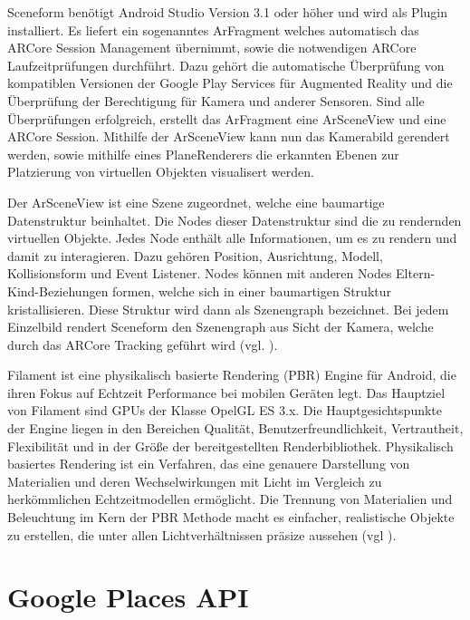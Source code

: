 Sceneform benötigt Android Studio Version 3.1 oder höher und wird als Plugin installiert. Es liefert ein sogenanntes \glqq ArFragment\grqq{} welches automatisch das ARCore Session Management übernimmt, sowie die notwendigen ARCore Laufzeitprüfungen durchführt. Dazu gehört die automatische Überprüfung von kompatiblen Versionen der Google Play Services für Augmented Reality und die Überprüfung der Berechtigung für Kamera und anderer Sensoren. Sind alle Überprüfungen erfolgreich, erstellt das ArFragment eine \glqq ArSceneView\grqq{} und eine ARCore Session. Mithilfe der ArSceneView kann nun das Kamerabild gerendert werden, sowie mithilfe eines \glqq PlaneRenderers\grqq{} die erkannten Ebenen zur Platzierung von virtuellen Objekten visualisert werden.

Der ArSceneView ist eine Szene zugeordnet, welche eine baumartige Datenstruktur beinhaltet. Die Nodes dieser Datenstruktur sind die zu rendernden virtuellen Objekte. Jedes Node enthält alle Informationen, um es zu rendern und damit zu interagieren. Dazu gehören Position, Ausrichtung, Modell, Kollisionsform und Event Listener. Nodes können mit anderen Nodes Eltern-Kind-Beziehungen formen, welche sich in einer baumartigen Struktur kristallisieren. Diese Struktur wird dann als Szenengraph bezeichnet. Bei jedem Einzelbild rendert Sceneform den Szenengraph aus Sicht der Kamera, welche durch das ARCore Tracking geführt wird (vgl. \cite{sceneform_google}). 

Filament ist eine physikalisch basierte Rendering (PBR) Engine für Android, die ihren Fokus auf Echtzeit Performance bei mobilen Geräten legt. Das Hauptziel von Filament sind GPUs der Klasse OpelGL ES 3.x. Die Hauptgesichtspunkte der Engine liegen in den Bereichen Qualität, Benutzerfreundlichkeit, Vertrautheit, Flexibilität und in der Größe der bereitgestellten Renderbibliothek. Physikalisch basiertes Rendering ist ein Verfahren, das eine genauere Darstellung von Materialien und deren Wechselwirkungen mit Licht im Vergleich zu herkömmlichen Echtzeitmodellen ermöglicht. Die Trennung von Materialien und Beleuchtung im Kern der PBR Methode macht es einfacher, realistische Objekte zu erstellen, die unter allen Lichtverhältnissen präsize aussehen (vgl \cite{filament}).


\section{Google Places API}

